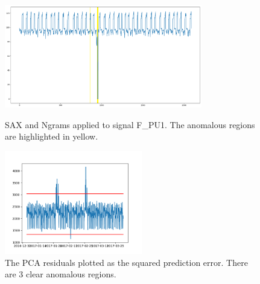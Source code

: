 \documentclass[]{article}
\begin{document}
\begin{center}
	\begin{figure}[H]
		\begin{minipage}{.475\textwidth}
			\includegraphics[width=1\linewidth, height=4.5cm]{./visuallizations/SAX_anomaly.png}
			\caption{SAX and Ngrams applied to signal F\_PU1. The anomalous regions are highlighted in yellow.}
			\label{predictions}
		\end{minipage}
		\begin{minipage}{.475\textwidth}
			\includegraphics[width=1\linewidth, height=4.5cm]{./visuallizations/PCA_residuals.png}
			\caption{The PCA residuals plotted as the squared prediction error. There are 3 clear anomalous regions.}
			\label{PCA}
		\end{minipage} %
	\end{figure}
\end{center}
\clearpage
\end{document}
